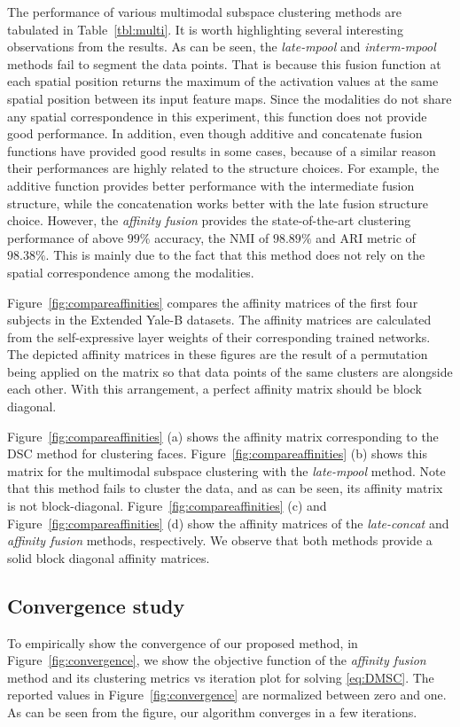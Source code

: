 \documentclass[journal]{IEEEtran}
\begin{document}
The performance of various multimodal subspace clustering methods are tabulated in Table~\ref{tbl:multi}.	  It is worth highlighting several interesting observations from the results.   As can be seen, the \textit{late-mpool} and \textit{interm-mpool} methods fail to segment the data points.  	That is because this fusion function at each spatial position returns the maximum of the activation values at the same spatial position between its input feature maps.  Since the modalities do not share any spatial correspondence in this experiment, this function does not provide good performance.   In addition,  even though additive and concatenate fusion functions have provided good results in some cases, because of a similar reason their performances are highly related to the structure choices.  For example, the additive function provides better performance with the intermediate fusion structure, while the concatenation works better with the late fusion structure choice.     However,  the \textit{affinity fusion} provides the state-of-the-art clustering performance of above $99\%$ accuracy, the NMI of $98.89\%$ and ARI metric of $98.38\%$.   This is mainly due to the fact that this method does not rely on the spatial correspondence among the modalities. 
 
Figure~\ref{fig:compareaffinities} compares the affinity matrices of the first four subjects in the Extended Yale-B datasets.  The affinity matrices are calculated from the self-expressive layer weights of their corresponding trained networks.      The depicted affinity matrices in these figures are the result of a permutation being applied on the matrix so that data points of the same clusters are alongside each other.   With this arrangement, a perfect affinity matrix should be block diagonal. 

Figure~\ref{fig:compareaffinities} (a) shows the affinity matrix corresponding to the DSC method for clustering faces.   Figure~\ref{fig:compareaffinities} (b) shows this matrix for the multimodal subspace clustering with the \textit{late-mpool} method.  Note that this method fails to cluster the data, and as can be seen, its affinity matrix is not block-diagonal.      Figure~\ref{fig:compareaffinities} (c) and Figure~\ref{fig:compareaffinities} (d) show the affinity matrices of the \textit{late-concat} and \textit{affinity fusion} methods, respectively.  We observe that both methods provide a solid block diagonal affinity matrices.

\subsection{Convergence study}
To empirically show the convergence of our proposed method, in Figure~\ref{fig:convergence}, we show the objective function of the \emph{affinity fusion} method and its clustering metrics vs iteration plot for solving \eqref{eq:DMSC}.  The reported values in Figure~\ref{fig:convergence} are normalized between zero and one.   As can be seen from the figure, our algorithm converges in a few iterations.
\end{document}
